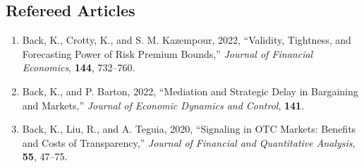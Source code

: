 \documentclass[margin, 11pt]{res}
\begin{document}
\begin{resume}
\clearpage

\section{\sc Refereed Articles}
\begin{enumerate}
\item Back, K., Crotty, K., and S. M. Kazempour, 2022, ``Validity, Tightness, and Forecasting Power of Risk Premium Bounds,''  \textit{Journal of Financial Economics}, \textbf{144}, 732--760.
 \item Back, K., and P. Barton, 2022, ``Mediation and Strategic Delay in Bargaining and Markets,'' \textit{Journal of Economic Dynamics and Control}, \textbf{141}.
\item Back, K., Liu, R., and A. Teguia, 2020, ``Signaling in OTC Markets: Benefits and Costs of Transparency,'' \textit{Journal of Financial and Quantitative Analysis}, \textbf{55}, 47--75.


\end{enumerate}
\end{resume}
\end{document}
